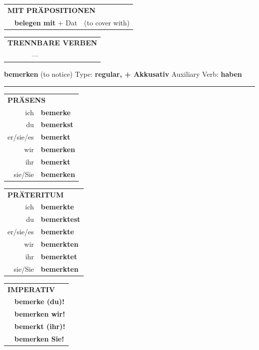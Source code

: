 \documentclass[10pt,a4paper]{revtex4-2}
\begin{document}
\begin{verbbox-acc}
\vspace{10pt}

\begin{tabular}{lll}
\multicolumn{3}{l}{\textbf{MIT PRÄPOSITIONEN}}\\
& \textbf{belegen mit} + Dat & (to cover with)\\
\end{tabular}
\hfill
\begin{tabular}{lll}
\multicolumn{3}{l}{\textbf{TRENNBARE VERBEN}}\\
& ---\\
\end{tabular}
\vspace{-5pt}
\end{verbbox-acc}

\begin{verbbox-acc}
{\Large \bf bemerken} (to notice) \hfill Type: \textbf{regular, + Akkusativ} \hfill Auxiliary Verb: \textbf{haben}

\vspace{5pt}
\hrule
\vspace{5pt}

\begin{tabular}{rl}
\multicolumn{2}{l}{\textbf{PRÄSENS}}\\
ich & \textbf{bemerke}\\
du & \textbf{bemerkst}\\
er/sie/es & \textbf{bemerkt}\\
wir & \textbf{bemerken}\\
ihr & \textbf{bemerkt}\\
sie/Sie & \textbf{bemerken}\\
\end{tabular}
\hfill
\begin{tabular}{rl}
\multicolumn{2}{l}{\textbf{PRÄTERITUM}}\\
ich & \textbf{bemerkte}\\
du & \textbf{bemerktest}\\
er/sie/es & \textbf{bemerkte}\\
wir & \textbf{bemerkten}\\
ihr & \textbf{bemerktet}\\
sie/Sie & \textbf{bemerkten}\\
\end{tabular}
\hfill
\begin{tabular}{rl}
\multicolumn{2}{l}{\textbf{IMPERATIV}}\\
& \textbf{bemerke (du)!}\\
& \textbf{bemerken wir!}\\
& \textbf{bemerkt (ihr)!}\\
& \textbf{bemerken Sie!}\\
\end{tabular}


\end{verbbox-acc}
\end{document}
